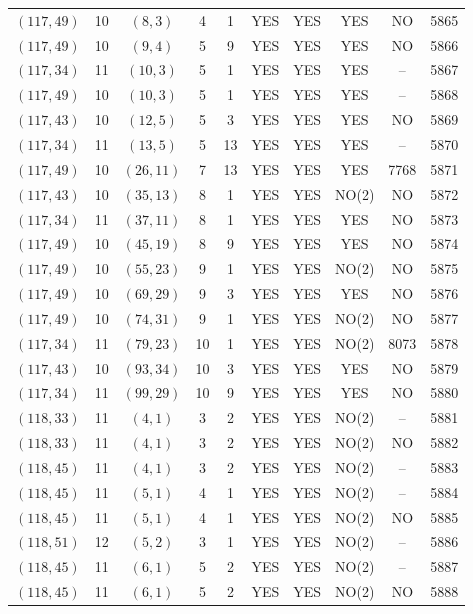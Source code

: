 \begin{longtable}{|c|c|c|c|c|c|c|c|c|c|}
$(117, 49)$ & 10 & $(8, 3)$ & 4 & 1 & YES & YES & YES & NO & 5865\\
$(117, 49)$ & 10 & $(9, 4)$ & 5 & 9 & YES & YES & YES & NO & 5866\\
$(117, 34)$ & 11 & $(10, 3)$ & 5 & 1 & YES & YES & YES & -- & 5867\\
$(117, 49)$ & 10 & $(10, 3)$ & 5 & 1 & YES & YES & YES & -- & 5868\\
$(117, 43)$ & 10 & $(12, 5)$ & 5 & 3 & YES & YES & YES & NO & 5869\\
$(117, 34)$ & 11 & $(13, 5)$ & 5 & 13 & YES & YES & YES & -- & 5870\\
$(117, 49)$ & 10 & $(26, 11)$ & 7 & 13 & YES & YES & YES & 7768 & 5871\\
$(117, 43)$ & 10 & $(35, 13)$ & 8 & 1 & YES & YES & NO(2) & NO & 5872\\
$(117, 34)$ & 11 & $(37, 11)$ & 8 & 1 & YES & YES & YES & NO & 5873\\
$(117, 49)$ & 10 & $(45, 19)$ & 8 & 9 & YES & YES & YES & NO & 5874\\
$(117, 49)$ & 10 & $(55, 23)$ & 9 & 1 & YES & YES & NO(2) & NO & 5875\\
$(117, 49)$ & 10 & $(69, 29)$ & 9 & 3 & YES & YES & YES & NO & 5876\\
$(117, 49)$ & 10 & $(74, 31)$ & 9 & 1 & YES & YES & NO(2) & NO & 5877\\
$(117, 34)$ & 11 & $(79, 23)$ & 10 & 1 & YES & YES & NO(2) & 8073 & 5878\\
$(117, 43)$ & 10 & $(93, 34)$ & 10 & 3 & YES & YES & YES & NO & 5879\\
$(117, 34)$ & 11 & $(99, 29)$ & 10 & 9 & YES & YES & YES & NO & 5880\\
$(118, 33)$ & 11 & $(4, 1)$ & 3 & 2 & YES & YES & NO(2) & -- & 5881\\
$(118, 33)$ & 11 & $(4, 1)$ & 3 & 2 & YES & YES & NO(2) & NO & 5882\\
$(118, 45)$ & 11 & $(4, 1)$ & 3 & 2 & YES & YES & NO(2) & -- & 5883\\
$(118, 45)$ & 11 & $(5, 1)$ & 4 & 1 & YES & YES & NO(2) & -- & 5884\\
$(118, 45)$ & 11 & $(5, 1)$ & 4 & 1 & YES & YES & NO(2) & NO & 5885\\
$(118, 51)$ & 12 & $(5, 2)$ & 3 & 1 & YES & YES & NO(2) & -- & 5886\\
$(118, 45)$ & 11 & $(6, 1)$ & 5 & 2 & YES & YES & NO(2) & -- & 5887\\
$(118, 45)$ & 11 & $(6, 1)$ & 5 & 2 & YES & YES & NO(2) & NO & 5888\\

\end{longtable}
